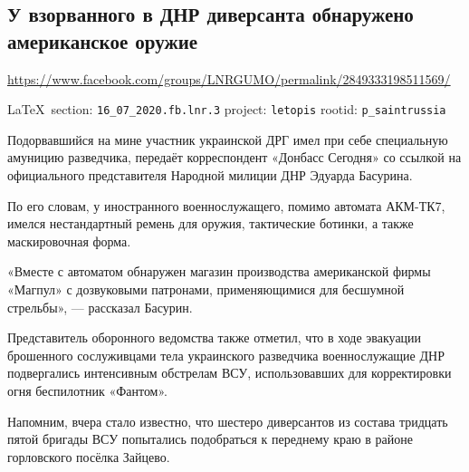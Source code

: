  
 
\subsection{У взорванного в ДНР диверсанта обнаружено американское оружие}
\url{https://www.facebook.com/groups/LNRGUMO/permalink/2849333198511569/}
  
\vspace{0.5cm}
{\ifDEBUG\small\LaTeX~section: \verb|16_07_2020.fb.lnr.3| project: \verb|letopis| rootid: \verb|p_saintrussia|\fi}
\vspace{0.5cm}
  
Подорвавшийся на мине участник украинской ДРГ имел при себе специальную амуницию разведчика, передаёт корреспондент «Донбасс Сегодня» со ссылкой на официального представителя Народной милиции ДНР Эдуарда Басурина.

По его словам, у иностранного военнослужащего, помимо автомата АКМ-ТК7, имелся нестандартный ремень для оружия, тактические ботинки, а также маскировочная форма.

«Вместе с автоматом обнаружен магазин производства американской фирмы «Магпул» с дозвуковыми патронами, применяющимися для бесшумной стрельбы», --- рассказал Басурин.

Представитель оборонного ведомства также отметил, что в ходе эвакуации брошенного сослуживцами тела украинского разведчика военнослужащие ДНР подвергались интенсивным обстрелам ВСУ, использовавших для корректировки огня беспилотник «Фантом».

Напомним, вчера стало известно, что шестеро диверсантов из состава тридцать пятой бригады ВСУ попытались подобраться к переднему краю в районе горловского посёлка Зайцево.
